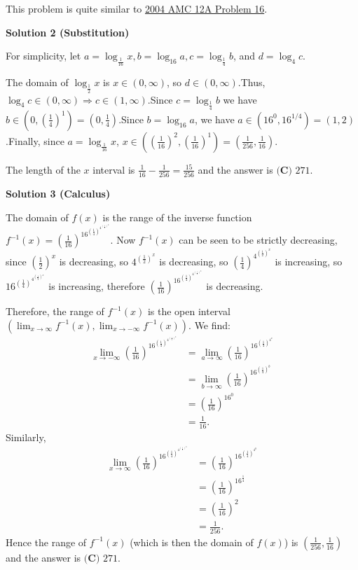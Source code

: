\begin{enumerate}
 This problem is quite similar to \href{https://artofproblemsolving.com/wiki/index.php?title=2004\_AMC\_12A\_Problems/Problem\_16}{2004 AMC 12A Problem 16}.

 



\textbf{Solution 2 (Substitution)}

For simplicity, let $a=\log_{\frac{1}{16}}{x},b=\log_{16}a,c=\log_{\frac{1}{4}}b$, and $d=\log_4c$.

 The domain of $\log_{\frac{1}{2}}x$ is $x \in (0, \infty)$, so $d \in (0, \infty)$.Thus, $\log_4{c} \in (0, \infty) \Rightarrow c \in (1, \infty)$.Since $c=\log_{\frac{1}{4}}b$ we have $b \in \left(0, \left(\frac{1}{4}\right)^1\right)=\left(0, \frac{1}{4}\right)$.Since $b=\log_{16}{a}$, we have $a \in (16^0,16^{1/4})=(1,2)$.Finally, since $a=\log_{\frac{1}{16}}{x}$, $x \in \left(\left(\frac{1}{16}\right)^2,\left(\frac{1}{16}\right)^1\right)=\left(\frac{1}{256},\frac{1}{16}\right)$.

 The length of the $x$ interval is $\frac{1}{16}-\frac{1}{256}=\frac{15}{256}$ and the answer is $\boxed{\textbf{(C) }271}$.

 



\textbf{Solution 3 (Calculus)}

The domain of $f(x)$ is the range of the inverse function $f^{-1}(x)=\left(\frac1{16}\right)^{16^{\left(\frac14\right)^{4^{\left(\frac12\right)^x}}}}$. Now $f^{-1}(x)$ can be seen to be strictly decreasing, since $\left(\frac12\right)^x$ is decreasing, so $4^{\left(\frac12\right)^x}$ is decreasing, so $\left(\frac14\right)^{4^{\left(\frac12\right)^x}}$ is increasing, so $16^{\left(\frac14\right)^{4^{\left(\frac12\right)^x}}}$ is increasing, therefore $\left(\frac1{16}\right)^{16^{\left(\frac14\right)^{4^{\left(\frac12\right)^x}}}}$ is decreasing.

 Therefore, the range of $f^{-1}(x)$ is the open interval $\left(\lim_{x\to\infty}f^{-1}(x), \lim_{x\to-\infty}f^{-1}(x)\right)$. We find:
 \begin{align*}    \lim_{x\to-\infty}\left(\frac1{16}\right)^{16^{\left(\frac14\right)^{4^{\left(\frac12\right)^x}}}}&= \lim_{a\to\infty}\left(\frac1{16}\right)^{16^{\left(\frac14\right)^{4^a}}}\\ &= \lim_{b\to\infty}\left(\frac1{16}\right)^{16^{\left(\frac14\right)^b}}\\ &= \left(\frac1{16}\right)^{16^0}\\ &= \frac{1}{16}. \end{align*}
Similarly,
 \begin{align*} \lim_{x\to\infty}\left(\frac1{16}\right)^{16^{\left(\frac14\right)^{4^{\left(\frac12\right)^x}}}}&=\left(\frac1{16}\right)^{16^{\left(\frac14\right)^{4^0}}}\\ &= \left(\frac1{16}\right)^{16^{\frac14}}\\ &= \left(\frac1{16}\right)^2\\ &= \frac{1}{256}. \end{align*}
Hence the range of $f^{-1}(x)$ (which is then the domain of $f(x)$) is $\left(\frac{1}{256},\frac{1}{16}\right)$ and the answer is $\boxed{\textbf{(C) }271}$.


\end{enumerate}
